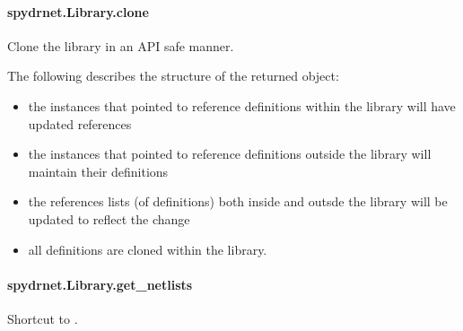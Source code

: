 \documentclass[letterpaper,10pt,english,openany,oneside]{sphinxmanual}
\begin{document}
\paragraph{spydrnet.Library.clone}
\label{\detokenize{reference/classes/generated/spydrnet.Library.clone:spydrnet-library-clone}}\label{\detokenize{reference/classes/generated/spydrnet.Library.clone::doc}}

\begin{fulllineitems}
\label{\detokenize{reference/classes/generated/spydrnet.Library.clone:spydrnet.Library.clone}}
Clone the library in an API safe manner.

The following describes the structure of the returned object:
\begin{itemize}
\item {} 
the instances that pointed to reference definitions within the library will have updated references

\item {} 
the instances that pointed to reference definitions outside the library will maintain their definitions

\item {} 
the references lists (of definitions) both inside and outsde the library will be updated to reflect the change

\item {} 
all definitions are cloned within the library.

\end{itemize}

\end{fulllineitems}



\paragraph{spydrnet.Library.get\_netlists}
\label{\detokenize{reference/classes/generated/spydrnet.Library.get_netlists:spydrnet-library-get-netlists}}\label{\detokenize{reference/classes/generated/spydrnet.Library.get_netlists::doc}}

\begin{fulllineitems}
\label{\detokenize{reference/classes/generated/spydrnet.Library.get_netlists:spydrnet.Library.get_netlists}}
Shortcut to {\hyperref[\detokenize{reference/classes/generated/spydrnet.get_netlists:spydrnet.get_netlists}]{}}.

\end{fulllineitems}
\end{document}
